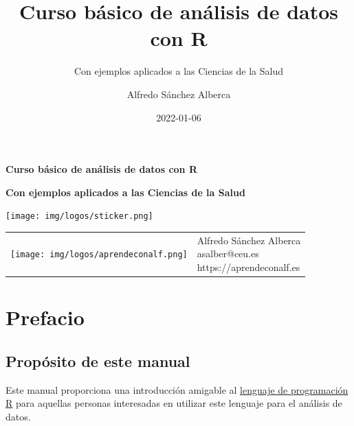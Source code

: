 \documentclass[
  a4paper,
]{scrreport}
\title{Curso básico de análisis de datos con R}
\subtitle{Con ejemplos aplicados a las Ciencias de la Salud}
\author{Alfredo Sánchez Alberca}
\date{2022-01-06}
\renewcommand*\contentsname{Indice de contenidos}
\newcommand\contentsname{Indice de contenidos}
\theoremstyle{definition}
\theoremstyle{definition}
\theoremstyle{remark}
\begin{document}
\begin{titlepage}

\begin{center}
\vspace*{5cm}

\Huge
{\textbf{\textsf{Curso básico de análisis de datos con R}}}

\vspace{0.5cm}
\LARGE
{\textbf{\textsf{Con ejemplos aplicados a las Ciencias de la Salud}}}

\vspace{1.5cm}

\texttt{[image: img/logos/sticker.png]}
\end{center}

\vfill

\begin{flushleft}
\begin{tabular}{ll}
\texttt{[image: img/logos/aprendeconalf.png]} & \parbox[b]{5cm}{\Large\textsf{Alfredo
Sánchez
Alberca}\\ \textsf{asalber@ceu.es} \\ \textsf{https://aprendeconalf.es}}
\end{tabular}
\end{flushleft}
\end{titlepage}
\renewcommand*\contentsname{Indice de contenidos}
{
\hypersetup{linkcolor=}
\setcounter{tocdepth}{2}
\tableofcontents
}


\chapter*{Prefacio}\label{prefacio}


\section*{Propósito de este manual}\label{propuxf3sito-de-este-manual}


Este manual proporciona una introducción amigable al
\href{https://www.r-project.org/}{lenguaje de programación R} para
aquellas personas interesadas en utilizar este lenguaje para el análisis
de datos.
\end{document}
